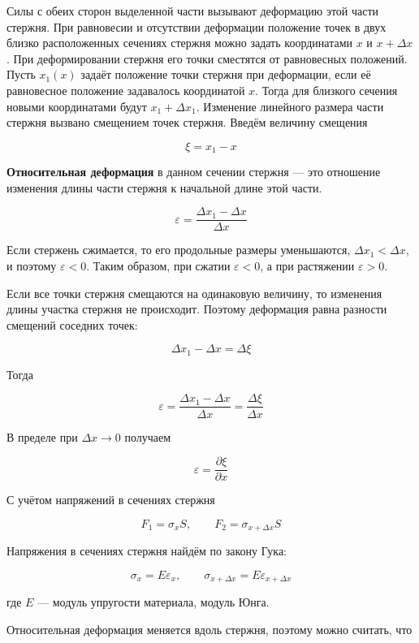 \documentclass[a4paper,12pt]{article}
\begin{document}
Силы с обеих сторон выделенной части вызывают деформацию этой части стержня. При равновесии и отсутствии деформации положение точек в двух близко расположенных сечениях стержня можно задать координатами \(x\) и \(x + \Delta x\). При деформировании стержня его точки сместятся от равновесных положений. Пусть \(x_1(x)\) задаёт положение точки стержня при деформации, если её равновесное положение задавалось координатой \(x\). Тогда для близкого сечения новыми координатами будут \(x_1 + \Delta x_1\). Изменение линейного размера части стержня вызвано смещением точек стержня. Введём величину смещения

\[
\xi = x_1 - x
\]

\begin{definitionbox}
\textbf{Относительная деформация} в данном сечении стержня — это отношение изменения длины части стержня к начальной длине этой части.
\end{definitionbox}

\[
\varepsilon = \frac{\Delta x_1 - \Delta x}{\Delta x}
\]

Если стержень сжимается, то его продольные размеры уменьшаются, \(\Delta x_1 < \Delta x\), и поэтому \(\varepsilon < 0\). Таким образом, при сжатии \(\varepsilon < 0\), а при растяжении \(\varepsilon > 0\).

Если все точки стержня смещаются на одинаковую величину, то изменения длины участка стержня не происходит. Поэтому деформация равна разности смещений соседних точек:

\[
\Delta x_1 - \Delta x = \Delta \xi
\]

Тогда

\[
\varepsilon = \frac{\Delta x_1 - \Delta x}{\Delta x} = \frac{\Delta \xi}{\Delta x}
\]

В пределе при \(\Delta x \to 0\) получаем

\[
\varepsilon = \frac{\partial \xi}{\partial x}
\]

С учётом напряжений в сечениях стержня

\[
F_1 = \sigma_x S,
\qquad
F_2 = \sigma_{x+\Delta x} S
\]

Напряжения в сечениях стержня найдём по закону Гука:

\[
\sigma_x = E \varepsilon_x,
\qquad
\sigma_{x+\Delta x} = E \varepsilon_{x+\Delta x}
\]

где \(E\) — модуль упругости материала, модуль Юнга.

Относительная деформация меняется вдоль стержня, поэтому можно считать, что
\end{document}
